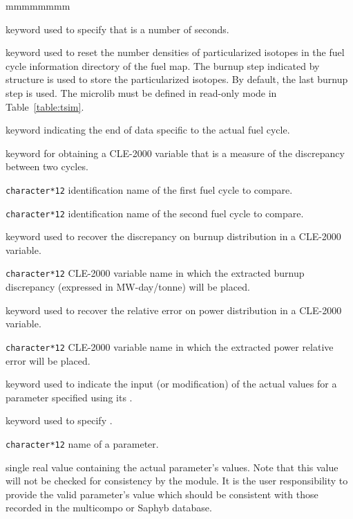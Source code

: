 \begin{ListeDeDescription}{mmmmmmmm}
\item[\moc{SECOND}] keyword used to specify that  is a number of seconds.

\item[\moc{SET-FOLLOW}] keyword used to reset the number densities of particularized isotopes in the  fuel cycle
information directory of the fuel map. The burnup step indicated by  structure is used to store the particularized isotopes. By default,
the last burnup step is used. The {\sc microlib}  must be defined in read-only mode in Table~\ref{table:tsim}.

\item[\moc{ENDCYCLE}] keyword indicating the end of data specific to the actual fuel cycle.

\item[\moc{COMPARE}] keyword for obtaining a CLE-2000 variable that is a measure of the discrepancy between two
cycles.

\item[\dusa{hc1}] \texttt{character*12} identification name of the first fuel cycle to compare.

\item[\dusa{hc2}] \texttt{character*12} identification name of the second fuel cycle to compare.

\item[\moc{DIST-BURN}]  keyword used to recover the discrepancy on burnup distribution in a CLE-2000 variable.

\item[\dusa{epsburn}] \texttt{character*12} CLE-2000 variable name in which the extracted burnup discrepancy (expressed in MW-day/tonne) will be placed.

\item[\moc{DIST-POWR}]  keyword used to recover the relative error on power distribution in a CLE-2000 variable.

\item[\dusa{epspowr}] \texttt{character*12} CLE-2000 variable name in which the extracted power relative error will be placed.

\item[\moc{SET-PARAM}] keyword used to indicate the input (or modification)
of the actual values for a parameter specified using its .

\item[\moc{PNAME}] keyword used to specify .

\item[\dusa{PNAME}] \texttt{character*12} name of a parameter.

\item[\dusa{pvalue}] single real value containing the actual
parameter's values. Note that this value will not be checked for consistency
by the module. It is the user responsibility to provide the valid parameter's value
which should be consistent with those recorded in the multicompo or Saphyb database.

\end{ListeDeDescription}
\clearpage
